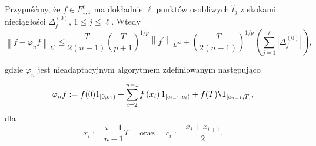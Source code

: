 \documentclass[oik, pdftex, robocza, man]{mgrwms}
\begin{document}
    \begin{stw}
        Przypuśćmy, że $f \in F_{1, 1}^{\ell}$ ma dokładnie $\ell$ punktów osobliwych $\hat{t}_{j}$ z skokami nieciągłości $\Delta_{j}^{(0)}$, $1 \leq j \leq \ell$. Wtedy
        \begin{equation*}
            \left\|f-\varphi_{n} f\right\|_{L^{p}} \leq \frac{T}{2(n-1)}\left(\frac{T}{p+1}\right)^{1 / p}\left\|f^{\prime}\right\|_{L^{\infty}}+\left(\frac{T}{2(n-1)}\right)^{1 / p}\left(\sum_{j=1}^{\ell}\left|\Delta_{j}^{(0)}\right|\right),
        \end{equation*}
        
        gdzie $\varphi_{n}$ jest nieadaptacyjnym algorytmem zdefiniowanym następująco
        \begin{equation*}
            \varphi_{n} f:=f(0) 1_{\left[0, c_{1}\right)}+\sum_{i=2}^{n-1} f\left(x_{i}\right) 1_{\left[c_{i-1}, c_{i}\right)}+f(T) \1_{\left[c_{n-1}, T\right]},
        \end{equation*}
        dla
        \begin{equation*}
            x_{i}:=\frac{i-1}{n-1} T \quad \text { oraz } \quad c_{i}:=\frac{x_{i}+x_{i+1}}{2}.
        \end{equation*}
    \end{stw}
\end{document}
